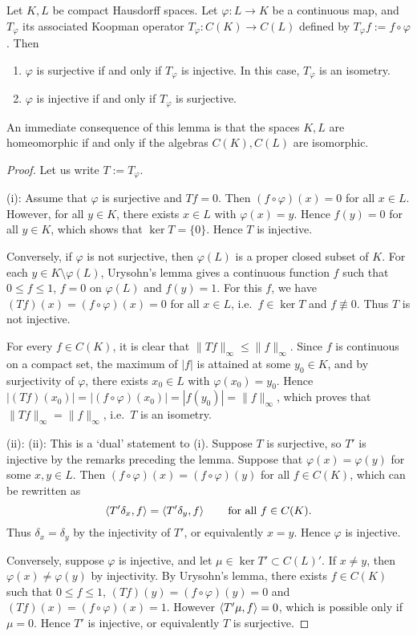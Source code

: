 \begin{lemma}
	Let $K, L$ be compact Hausdorff spaces. Let $\varphi:L\to K$ be a continuous map, and $T_\varphi$ its associated Koopman operator $T_\varphi: C(K)\to C(L)$ defined by $T_\varphi f := f \circ \varphi$. Then
	\begin{enumerate}[\upshape (i)]
		\item $\varphi$ is surjective if and only if $T_\varphi$ is injective. In this case, $T_\varphi$ is an isometry.
		\item $\varphi$ is injective if and only if $T_\varphi$ is surjective.
	\end{enumerate}
\end{lemma}
An immediate consequence of this lemma is that the spaces $K,L$ are homeomorphic if and only if the algebras $C(K),C(L)$ are isomorphic.

\begin{proof}
	Let us write $T := T_\varphi$.
	
	(i): Assume that $\varphi$ is surjective and $Tf = 0$. Then $(f\circ\varphi)(x)=0$ for all $x\in L$. However, for all $y\in K$, there exists $x\in L$ with $\varphi(x)=y$. Hence $f(y)=0$ for all $y\in K$, which shows that $\ker T = \{0\}$. Hence $T$ is injective.
	
	Conversely, if $\varphi$ is not surjective, then $\varphi(L)$ is a proper closed subset of $K$. For each $y\in K \setminus \varphi(L)$, Urysohn's lemma gives a continuous function $f$ such that $0 \le f \le 1$, $f=0$ on $\varphi(L)$ and $f(y)=1$. For this $f$, we have $(Tf)(x) = (f\circ\varphi)(x) = 0$ for all $x\in L$, i.e.\ $f \in \ker T$ and $f \not\equiv 0$. Thus $T$ is not injective.
	
	For every $f \in C(K)$, it is clear that $\|Tf\|_\infty \le \|f\|_\infty$. Since $f$ is continuous on a compact set, the maximum of $|f|$ is attained at some $y_0\in K$, and by surjectivity of $\varphi$, there exists $x_0\in L$ with $\varphi(x_0)=y_0$. Hence $|(Tf)(x_0)| = |(f\circ\varphi)(x_0)| = |f(y_0)| = \|f\|_\infty$, which proves that $\|Tf\|_\infty = \|f\|_\infty$, i.e.\ $T$ is an isometry.
	
	(ii): (ii): This is a `dual' statement to (i). Suppose $T$ is surjective, so $T'$ is injective by the remarks preceding the lemma. Suppose that $\varphi(x)=\varphi(y)$ for some $x,y \in L$. Then $(f\circ\varphi)(x)=(f\circ\varphi)(y)$ for all $f\in C(K)$, which can be rewritten as
	\begin{equation*}
		\braket{T'\delta_x,f} = \braket{T'\delta_y,f} \qquad \text{for all } f \in C(K).
	\end{equation*}
	Thus $\delta_x = \delta_y$ by the injectivity of $T'$, or equivalently $x=y$. Hence $\varphi$ is injective.
	
	Conversely, suppose $\varphi$ is injective, and let $\mu\in\ker T' \subset C(L)'$. If $x\ne y$, then $\varphi(x)\ne \varphi(y)$ by injectivity. By Urysohn's lemma, there exists $f\in C(K)$ such that $0\le f\le 1$, $(Tf)(y)=(f\circ\varphi)(y)=0$ and $(Tf)(x)=(f\circ\varphi)(x)=1$. However $\braket{T'\mu, f} = 0$, which is possible only if $\mu=0$. Hence $T'$ is injective, or equivalently $T$ is surjective.
\end{proof}

